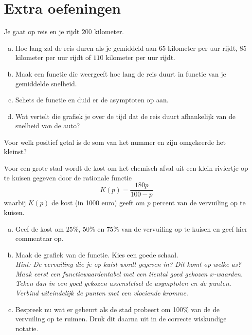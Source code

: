 \documentclass[12pt]{article}
\begin{document}
\section{Extra oefeningen}

\begin{oefening}
Je gaat op reis en je rijdt $200$ kilometer.
\begin{enumerate}[(a)]
  \item Hoe lang zal de reis duren als je gemiddeld aan $65$ kilometer per uur rijdt, $85$ kilometer per uur rijdt of $110$ kilometer per uur rijdt.
  \item Maak een functie die weergeeft hoe lang de reis duurt in functie van je gemiddelde snelheid.
  \item Schets de functie en duid er de asymptoten op aan.
  \item Wat vertelt die grafiek je over de tijd dat de reis duurt afhankelijk van de snelheid van de auto?
\end{enumerate}
\end{oefening}

\begin{oefening}
Voor welk positief getal is de som van het nummer en zijn omgekeerde het kleinst?
\end{oefening}

\begin{oefening}
Voor een grote stad wordt de kost om het chemisch afval uit een klein riviertje op te kuisen gegeven door de rationale functie
$$K(p)=\frac{180p}{100-p}$$
waarbij $K(p)$ de kost (in 1000 euro) geeft om $p$ percent van de vervuiling op te kuisen.
\begin{enumerate}[(a)]
  \item Geef de kost om 25\%, 50\% en 75\% van de vervuiling op te kuisen en geef hier commentaar op.
  \item Maak de grafiek van de functie. Kies een goede schaal.\\
  {\small\em Hint: De vervuiling die je op kuist wordt gegeven in? Dit komt op welke as? Maak eerst een functiewaardentabel met een tiental goed gekozen $x$-waarden. Teken dan in een goed gekozen assenstelsel de asymptoten en de punten. Verbind uiteindelijk de punten met een vloeiende kromme.}
  \item Bespreek nu wat er gebeurt als de stad probeert om 100\% van de de vervuiling op te ruimen. Druk dit daarna uit in de correcte wiskundige notatie.
\end{enumerate}
\end{oefening}
\end{document}
